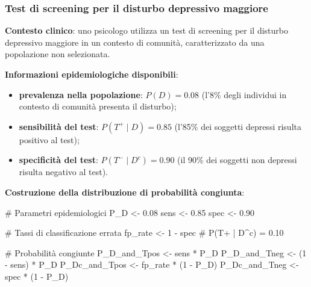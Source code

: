\documentclass[
  letterpaper,
  DIV=11,
  numbers=noendperiod,
  oneside]{scrreprt}
\newenvironment{Shaded}{\begin{snugshade}}{\end{snugshade}}
\newcommand{\CommentTok}[1]{\textcolor[rgb]{0.37,0.37,0.37}{#1}}
\newcommand{\DecValTok}[1]{\textcolor[rgb]{0.68,0.00,0.00}{#1}}
\newcommand{\FloatTok}[1]{\textcolor[rgb]{0.68,0.00,0.00}{#1}}
\newcommand{\NormalTok}[1]{\textcolor[rgb]{0.00,0.23,0.31}{#1}}
\newcommand{\OtherTok}[1]{\textcolor[rgb]{0.00,0.23,0.31}{#1}}
\newcommand{\SpecialCharTok}[1]{\textcolor[rgb]{0.37,0.37,0.37}{#1}}
\providecommand{\tightlist}{%
  \setlength{\itemsep}{0pt}\setlength{\parskip}{0pt}}
\theoremstyle{definition}
\theoremstyle{plain}
\theoremstyle{definition}
\theoremstyle{remark}
\begin{document}
\begin{tcolorbox}[enhanced jigsaw, arc=.35mm, breakable, colbacktitle=quarto-callout-note-color!10!white, opacityback=0, toprule=.15mm, rightrule=.15mm, colback=white, opacitybacktitle=0.6, leftrule=.75mm, coltitle=black, bottomtitle=1mm, left=2mm, toptitle=1mm, title=\textcolor{quarto-callout-note-color}{\faInfo}\hspace{0.5em}{Esempio clinico completo}, titlerule=0mm, bottomrule=.15mm, colframe=quarto-callout-note-color-frame]

\subsubsection*{Test di screening per il disturbo depressivo
maggiore}\label{test-di-screening-per-il-disturbo-depressivo-maggiore}

\textbf{Contesto clinico}: uno psicologo utilizza un test di screening
per il disturbo depressivo maggiore in un contesto di comunità,
caratterizzato da una popolazione non selezionata.

\textbf{Informazioni epidemiologiche disponibili}:

\begin{itemize}
\tightlist
\item
  \textbf{prevalenza nella popolazione}: \(P(D) = 0.08\) (l'8\% degli
  individui in contesto di comunità presenta il disturbo);
\item
  \textbf{sensibilità del test}: \(P(T^+ \mid D) = 0.85\) (l'85\% dei
  soggetti depressi risulta positivo al test);
\item
  \textbf{specificità del test}: \(P(T^- \mid D^c) = 0.90\) (il 90\% dei
  soggetti non depressi risulta negativo al test).
\end{itemize}

\textbf{Costruzione della distribuzione di probabilità congiunta}:

\begin{Shaded}
\begin{Highlighting}[]
\CommentTok{\# Parametri epidemiologici}
\NormalTok{P\_D }\OtherTok{\textless{}{-}} \FloatTok{0.08}
\NormalTok{sens }\OtherTok{\textless{}{-}} \FloatTok{0.85}
\NormalTok{spec }\OtherTok{\textless{}{-}} \FloatTok{0.90}

\CommentTok{\# Tassi di classificazione errata}
\NormalTok{fp\_rate }\OtherTok{\textless{}{-}} \DecValTok{1} \SpecialCharTok{{-}}\NormalTok{ spec  }\CommentTok{\# P(T+ | D\^{}c) = 0.10}

\CommentTok{\# Probabilità congiunte}
\NormalTok{P\_D\_and\_Tpos }\OtherTok{\textless{}{-}}\NormalTok{ sens }\SpecialCharTok{*}\NormalTok{ P\_D}
\NormalTok{P\_D\_and\_Tneg }\OtherTok{\textless{}{-}}\NormalTok{ (}\DecValTok{1} \SpecialCharTok{{-}}\NormalTok{ sens) }\SpecialCharTok{*}\NormalTok{ P\_D}
\NormalTok{P\_Dc\_and\_Tpos }\OtherTok{\textless{}{-}}\NormalTok{ fp\_rate }\SpecialCharTok{*}\NormalTok{ (}\DecValTok{1} \SpecialCharTok{{-}}\NormalTok{ P\_D)}
\NormalTok{P\_Dc\_and\_Tneg }\OtherTok{\textless{}{-}}\NormalTok{ spec }\SpecialCharTok{*}\NormalTok{ (}\DecValTok{1} \SpecialCharTok{{-}}\NormalTok{ P\_D)}


\end{Highlighting}
\end{Shaded}
\end{tcolorbox}
\end{document}
